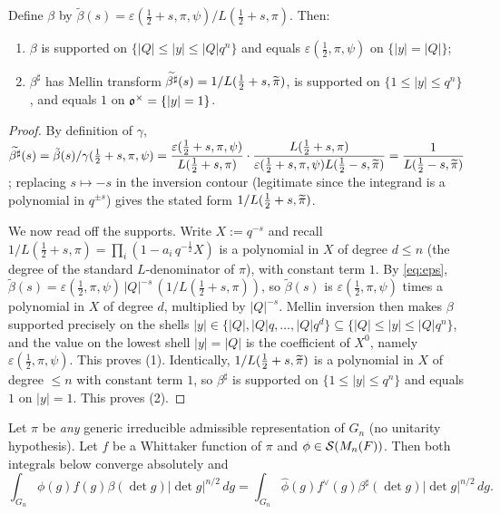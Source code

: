 \begin{qtwolemma}\label{lem:beta}
Define $\beta$ by $\tilde\beta(s)=\varepsilon(\tfrac12+s,\pi,\psi)/L(\tfrac12+s,\pi)$.
Then:
\begin{enumerate}\setlength\itemsep{2pt}
\item $\beta$ is supported on $\{|Q|\le|y|\le|Q|q^n\}$ and equals
$\varepsilon(\tfrac12,\pi,\psi)$ on $\{|y|=|Q|\}$;
\item $\beta^\sharp$ has Mellin transform $\widetilde{\beta^\sharp}(s)=1/L(\tfrac12+s,\widetilde{\pi})$,
is supported on $\{1\le|y|\le q^n\}$, and equals $1$ on $\mathfrak{o}^\times=\{|y|=1\}$.
\end{enumerate}
\end{qtwolemma}

\begin{proof}
By definition of $\gamma$,
$\widetilde{\beta^\sharp}(s)=\tilde\beta(s)/\gamma(\tfrac12+s,\pi,\psi)
=\dfrac{\varepsilon(\tfrac12+s,\pi,\psi)}{L(\tfrac12+s,\pi)}\cdot
\dfrac{L(\tfrac12+s,\pi)}{\varepsilon(\tfrac12+s,\pi,\psi)L(\tfrac12-s,\widetilde{\pi})}
=\dfrac{1}{L(\tfrac12-s,\widetilde{\pi})}$;
replacing $s\mapsto-s$ in the inversion contour (legitimate since the integrand is a
polynomial in $q^{\pm s}$) gives the stated form $1/L(\tfrac12+s,\widetilde{\pi})$.

We now read off the supports. Write $X:=q^{-s}$ and recall
$1/L(\tfrac12+s,\pi)=\prod_{i}(1-a_i\,q^{-\frac12}X)$ is a polynomial in $X$ of degree
$d\le n$ (the degree of the standard $L$-denominator of $\pi$), with constant term $1$.
By \eqref{eq:eps}, $\tilde\beta(s)=\varepsilon(\tfrac12,\pi,\psi)\,|Q|^{-s}\,(1/L(\tfrac12+s,\pi))$,
so $\tilde\beta(s)$ is $\varepsilon(\tfrac12,\pi,\psi)$ times a polynomial in $X$ of degree
$d$, multiplied by $|Q|^{-s}$. Mellin inversion then makes $\beta$ supported precisely on
the shells $|y|\in\{|Q|,|Q|q,\dots,|Q|q^{d}\}\subseteq\{|Q|\le|y|\le|Q|q^{n}\}$, and the
value on the lowest shell $|y|=|Q|$ is the coefficient of $X^{0}$, namely
$\varepsilon(\tfrac12,\pi,\psi)$. This proves (1). Identically, $1/L(\tfrac12+s,\widetilde{\pi})$
is a polynomial in $X$ of degree $\le n$ with constant term $1$, so $\beta^\sharp$ is
supported on $\{1\le|y|\le q^{n}\}$ and equals $1$ on $|y|=1$. This proves (2).
\end{proof}

\begin{qtwolemma}\label{lem:transfer}
Let $\pi$ be \emph{any} generic irreducible admissible representation of $G_n$ \textup{(}no
unitarity hypothesis\textup{)}. Let $f$ be a Whittaker function of $\pi$ and
$\phi\in\mathcal{S}(M_n(F))$. Then both integrals below converge absolutely and
\[
\int_{G_n}\phi(g)f(g)\beta(\det g)|\det g|^{n/2}\,dg
=\int_{G_n}\widehat\phi(g)f^\vee(g)\beta^\sharp(\det g)|\det g|^{n/2}\,dg.
\]
\end{qtwolemma}

